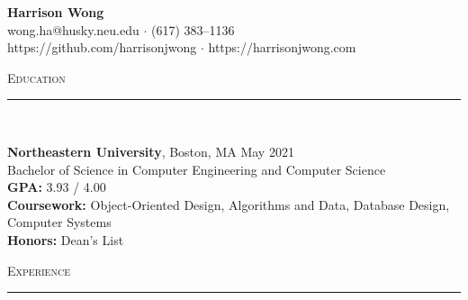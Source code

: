 \documentclass[11pt]{article}
\begin{document}
\small
\center
	\textbf{\huge Harrison Wong}  \\
	\vspace{0.05in}
	wong.ha@husky.neu.edu $\cdot$ (617) 383--1136 \\
	https://github.com/harrisonjwong $\cdot$ https://harrisonjwong.com \\
	\vspace{0.1in}
	
\begin{raggedright}

	\textsc{\Large Education} \\
	\vspace{-0.1in}
	\rule{\textwidth}{0.4pt} \\
	\vspace{0.05in}

	\textbf{\large Northeastern University}, Boston, MA 
	\hfill May 2021 \\
	Bachelor of Science in Computer Engineering and Computer Science \\
	\textbf{GPA:} \hspace{33pt} 3.93 / 4.00 \\
	\textbf{Coursework:} Object-Oriented Design, Algorithms and Data, Database Design, Computer Systems \\
	\textbf{Honors:} \hspace {19pt} Dean's List
	\vspace{0.1in}
	
	\textsc{\Large Experience} \\
	\vspace{-0.1in}
	\rule{\textwidth}{0.4pt} \\
	\vspace{0.05in}
	

\end{raggedright}
\end{document}

